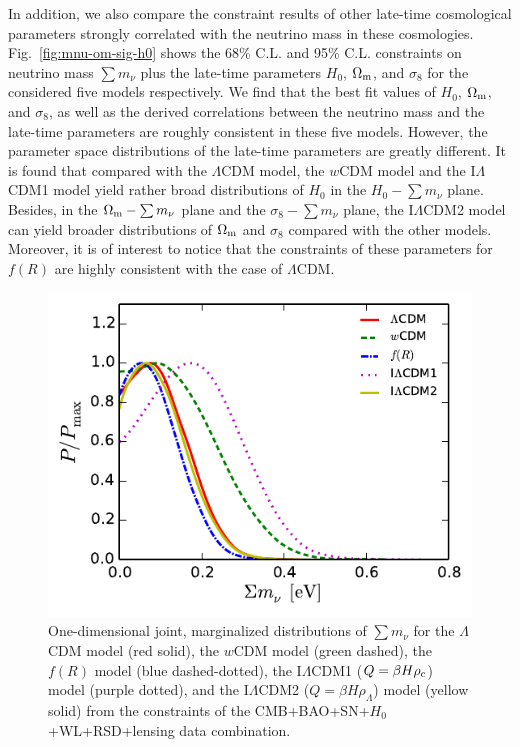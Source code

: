 \documentclass[aps,prd,nofootinbib,amsmath,amssymb,twocolumn,superscriptaddress,10pt]{revtex4}%
\begin{document}
In addition, we also compare the constraint results of other late-time cosmological parameters strongly correlated with the neutrino mass in these cosmologies. Fig.~\ref{fig:mnu-om-sig-h0} shows the 68\% C.L. and 95\% C.L. constraints on neutrino mass $\sum m_{\nu}$ plus the late-time parameters $H_{0}$, $\Omega_{\rm m}$, and $\sigma_{8}$ for the considered five models respectively. {We find that the best fit values of $H_{0}$, $\Omega_{\rm m}$, and $\sigma_{8}$, as well as the derived correlations between the neutrino mass and the late-time parameters are roughly consistent in these five models.}
However, the parameter space distributions of the late-time parameters are greatly different. It is found that compared with the $\Lambda$CDM model, the $w$CDM model and the I$\Lambda$CDM1 model yield rather broad distributions of $H_{0}$ in the $H_{0}-\sum m_{\nu}$ plane. Besides, in the $\Omega_{\rm m}-\sum m_{\nu}$ plane and the $\sigma_{8}-\sum m_{\nu}$ plane, the I$\Lambda$CDM2 model can yield broader distributions of $\Omega_{\rm m}$ and $\sigma_{8}$ compared with the other models. Moreover, it is of interest to notice that the constraints of these parameters for $f(R)$ are highly consistent with the case of $\Lambda$CDM. 

\begin{figure}
\begin{center}
\includegraphics[scale=0.8, angle=0]{mnu-1D.pdf}
\caption{One-dimensional joint, marginalized distributions of $\sum m_{\nu}$ for the $\Lambda$CDM model (red solid), the $w$CDM model (green dashed), the $f(R)$ model (blue dashed-dotted), the I$\Lambda$CDM1 ($Q=\beta H\rho_{\rm c}$) model (purple dotted), and the I$\Lambda$CDM2 ($Q=\beta H\rho_{\Lambda}$) model (yellow solid) from the constraints of the CMB+BAO+SN+$H_{0}$+WL+RSD+lensing data combination.}
\label{fig:mnu}
\end{center}
\end{figure}
\end{document}
